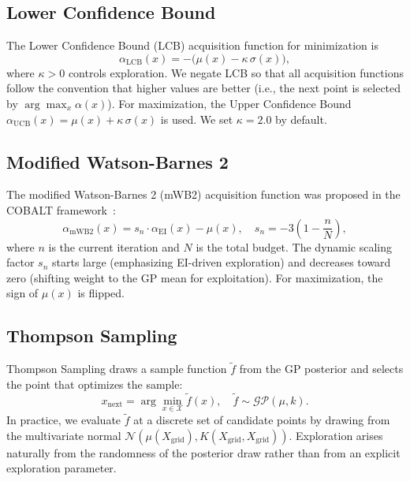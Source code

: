 \documentclass[12pt,a4paper]{article}%
\theoremstyle{plain}%
\theoremstyle{remark}%
\theoremstyle{definition}%
\begin{document}
\begin{appendices}
\subsection{Lower Confidence Bound}\label{subsec:app_lcb}

The Lower Confidence Bound (LCB) acquisition function for minimization is
\begin{equation}\label{eq:lcb}
    \alpha_\text{LCB}(x) = -\bigl(\mu(x) - \kappa\,\sigma(x)\bigr),
\end{equation}
where $\kappa > 0$ controls exploration. We negate LCB so that all acquisition functions follow the convention that higher values are better (i.e., the next point is selected by $\arg\max_x \alpha(x)$). For maximization, the Upper Confidence Bound $\alpha_\text{UCB}(x) = \mu(x) + \kappa\,\sigma(x)$ is used. We set $\kappa = 2.0$ by default.

\subsection{Modified Watson-Barnes 2}\label{subsec:app_mwb2}

The modified Watson-Barnes 2 (mWB2) acquisition function was proposed in the COBALT framework~\cite{paulson2022cobalt}:
\begin{equation}\label{eq:mwb2}
    \alpha_\text{mWB2}(x) = s_n \cdot \alpha_\text{EI}(x) - \mu(x), \quad s_n = -3\left(1 - \frac{n}{N}\right),
\end{equation}
where $n$ is the current iteration and $N$ is the total budget. The dynamic scaling factor $s_n$ starts large (emphasizing EI-driven exploration) and decreases toward zero (shifting weight to the GP mean for exploitation). For maximization, the sign of $\mu(x)$ is flipped.

\subsection{Thompson Sampling}\label{subsec:app_thompson}

Thompson Sampling draws a sample function $\tilde{f}$ from the GP posterior and selects the point that optimizes the sample:
\begin{equation}\label{eq:thompson}
    x_\text{next} = \arg\min_{x \in \mathcal{X}} \tilde{f}(x), \quad \tilde{f} \sim \mathcal{GP}(\mu, k).
\end{equation}
In practice, we evaluate $\tilde{f}$ at a discrete set of candidate points by drawing from the multivariate normal $\mathcal{N}(\mu(X_\text{grid}), K(X_\text{grid}, X_\text{grid}))$. Exploration arises naturally from the randomness of the posterior draw rather than from an explicit exploration parameter.


\end{appendices}
\end{document}
